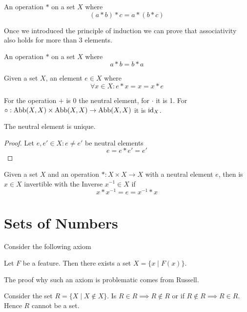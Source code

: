 \begin{definition}
   An operation \(\ast\) on a set \(X\) where
   \[(a \ast b) \ast c = a \ast (b \ast c)\]
\end{definition}
\begin{remark}
   Once we introduced the principle of induction we can prove that associativity also holds for more than 3 elements.
\end{remark}

\begin{definition}
   An operation \(\ast\) on a set \(X\) where
   \[a \ast b = b \ast a\]
\end{definition}

\begin{definition}
   Given a set \(X\), an element \(e \in X\) where
   \[\forall x \in X: e \ast x = x = x \ast e\]
\end{definition}
\begin{example}
   For the operation \(+\) is 0 the neutral element, for \(\cdot\) it is 1.
   For \(\circ: \operatorname{Abb}(X, X) \times \operatorname{Abb}(X, X) \to \operatorname{Abb}(X, X)\) it is \(\operatorname{id}_X\).
\end{example}

\begin{proposition}
   The neutral element is unique.
\end{proposition}
\begin{proof}
   Let \(e, e' \in X: e \neq e'\) be neutral elements
   \[e = e \ast e' = e'\]
\end{proof}

\begin{definition}[Invertible]
   Given a set \(X\) and an operation \(\ast: X \times X \to X\) with a neutral element \(e\), then is \(x \in X\) invertible with the Inverse \(x^{-1} \in X\) if
   \[x \ast x^{-1} = e = x^{-1} \ast x\]
\end{definition}

\section{Sets of Numbers}
Consider the following axiom

Let \(F\) be a feature.
Then there exists a set \(X = \{x \mid F(x)\}\).

The proof why such an axiom is problematic comes from Russell.

Consider the set \(R = \{X \mid X \not\in X\}\).
Is \(R \in R \implies R \not\in R\) or if \(R \not\in R \implies R \in R\).
Hence \(R\) cannot be a set.

